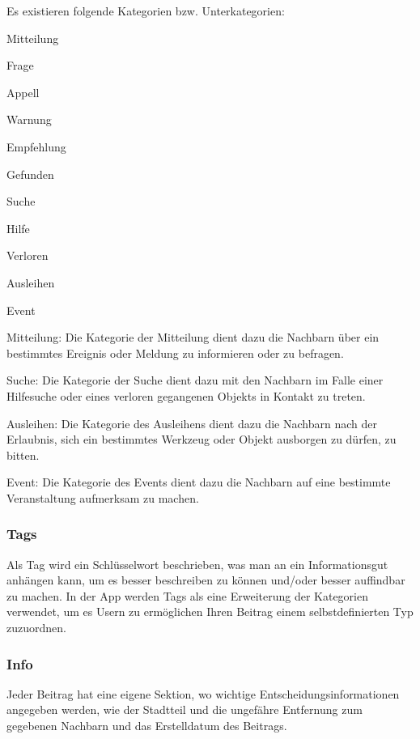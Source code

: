 Es existieren folgende Kategorien bzw. Unterkategorien:

\begin{compactitem}
  \item Mitteilung
  \begin{compactitem}
    \item Frage
    \item Appell
    \item Warnung
    \item Empfehlung
    \item Gefunden
  \end{compactitem}
  \item Suche
  \begin{compactitem}
    \item Hilfe
    \item Verloren
  \end{compactitem}
  \item Ausleihen
  \item Event
\end{compactitem}



Mitteilung:
Die Kategorie der Mitteilung dient dazu die Nachbarn über ein bestimmtes Ereignis oder Meldung zu informieren oder zu befragen.

Suche:
Die Kategorie der Suche dient dazu mit den Nachbarn im Falle einer Hilfesuche oder eines verloren gegangenen Objekts in Kontakt zu treten.

Ausleihen:
Die Kategorie des Ausleihens dient dazu die Nachbarn nach der Erlaubnis, sich ein bestimmtes Werkzeug oder Objekt ausborgen zu dürfen, zu bitten.

Event:
Die Kategorie des Events dient dazu die Nachbarn auf eine bestimmte Veranstaltung aufmerksam zu machen.


\subsubsection{Tags}
Als Tag wird ein Schlüsselwort beschrieben, was man an ein Informationsgut anhängen kann, um es besser beschreiben zu können und/oder besser auffindbar zu machen. In der App werden Tags als eine Erweiterung der Kategorien verwendet, um es Usern zu ermöglichen Ihren Beitrag einem selbstdefinierten Typ zuzuordnen.

\subsubsection{Info}
Jeder Beitrag hat eine eigene Sektion, wo wichtige Entscheidungsinformationen angegeben werden, wie der Stadtteil und die ungefähre Entfernung zum gegebenen Nachbarn und das Erstelldatum des Beitrags.

